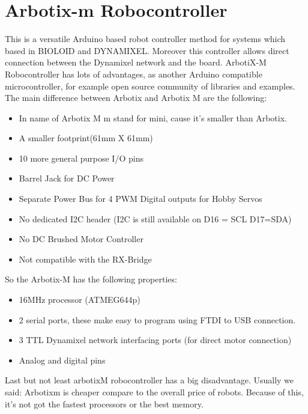 			\newpage
		
	\section{Arbotix-m Robocontroller}
	
		\hspace{15pt}This is a versatile Arduino based robot controller method for systems which based in BIOLOID and DYNAMIXEL. Moreover this controller allows direct connection between the Dynamixel network and the board. ArbotiX-M Robocontroller has lots of advantages, as another Arduino compatible microcontroller, for example open source community of libraries and examples. The main difference between Arbotix and Arbotix M are the following: 
		
		\begin{itemize}
			\item In name of Arbotix M m stand for mini, cause it’s smaller than Arbotix.
			\item A smaller footprint(61mm X 61mm)
			\item 10 more general purpose I/O pins
			\item Barrel Jack for DC Power
			\item Separate Power Bus for 4 PWM Digital outputs for Hobby Servos
			\item No dedicated I2C header (I2C is still available on D16 = SCL D17=SDA)
			\item No DC Brushed Motor Controller
			\item Not compatible with the RX-Bridge
		\end{itemize}
		
		So the Arbotix-M has the following properties:
		
		\begin{itemize}
			\item 16MHz processor (ATMEG644p)
			\item 2 serial ports, these make easy to program using FTDI to USB connection.
			\item 3 TTL Dynamixel network interfacing ports (for direct motor connection)
			\item Analog and digital pins
		\end{itemize}

		Last but not least arbotixM robocontroller has a big disadvantage. Usually we said: Arbotixm is cheaper compare to the overall price of robots. Because of this, it’s not got the fastest processors or the best memory.
	
